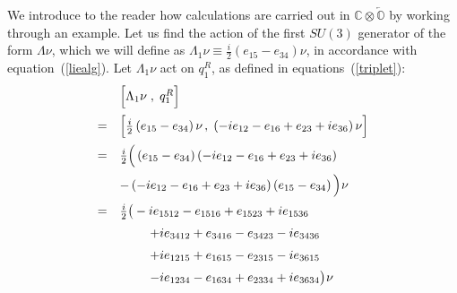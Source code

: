 \documentclass[letterpaper,12pt,titlepage,oneside,final]{book}
\newcommand{\spacer}{0.2cm}
\begin{document}
We introduce to the reader how calculations are carried out in $\mathbb{C}\otimes\overleftarrow{\mathbb{O}}$  by working through an example.  Let us find the action of the first $SU(3)$ generator of the form $\Lambda \nu$, which we will define as $\Lambda_1\nu\equiv\frac{i}{2}\left(e_{15}-e_{34}\right)\nu$, in accordance with equation~(\ref{liealg}).  Let $\Lambda_1\nu$ act on $q^R_{1}$, as defined in equations~(\ref{triplet}):
\begin{equation}\begin{array}{ll}\label{calc} & \Big[ \Lambda_1\nu \hspace{1mm},\hspace{1mm} q^R_{1} \Big]\vspace{\spacer}   \\
=& \Big[\frac{i}{2}\left(e_{15}-e_{34}\right)\nu\hspace{0.5mm} ,\hspace{1mm}\left(-ie_{12}-e_{16}+e_{23}+ie_{36}\right)\nu \Big]\vspace{\spacer} \\
=&\frac{i}{2}\Big( \left(e_{15}-e_{34}\right)\left(-ie_{12}-e_{16}+e_{23}+ie_{36}\right)\vspace{\spacer} \\
 &- \left(-ie_{12}-e_{16}+e_{23}+ie_{36}\right)\left(e_{15}-e_{34}\right) \Big)\hspace{0.2mm}\nu\vspace{\spacer} \\
=&\frac{i}{2}\big(-ie_{1512}-e_{1516}+e_{1523}+ie_{1536}\vspace{\spacer} \\
&\hspace{0.85cm}+ie_{3412}+e_{3416}-e_{3423}-ie_{3436}\vspace{\spacer} \\
&\hspace{0.85cm}+ie_{1215}+e_{1615}-e_{2315}-ie_{3615}\vspace{\spacer} \\
&\hspace{0.85cm}-ie_{1234}-e_{1634}+e_{2334}+ie_{3634}\big)\hspace{0.2mm}\nu\vspace{\spacer} \\

\end{array}
\end{equation}
\end{document}
